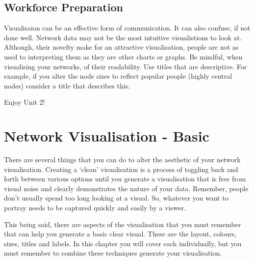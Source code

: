 \documentclass[
  letterpaper,
  DIV=11,
  numbers=noendperiod]{scrreprt}
\begin{document}
\section{Workforce Preparation}\label{workforce-preparation-1}

Visualisaion can be an effective form of communication. It can also
confuse, if not done well. Network data may not be the most intuitive
visualistions to look at. Although, their novelty make for an attractive
visualisation, people are not as used to interpreting them as they are
other charts or graphs. Be mindful, when visualising your networks, of
their readability. Use titles that are descriptive. For example, if you
alter the node sizes to reflect popular people (highly central nodes)
consider a title that describes this.

Enjoy Unit 2!

\chapter{Network Visualisation -
Basic}\label{network-visualisation---basic}

There are several things that you can do to alter the aesthetic of your
network visualisation. Creating a `clean' visualisation is a process of
toggling back and forth between various options until you generate a
visualisation that is free from visual noise and clearly demonstrates
the nature of your data. Remember, people don't usually spend too long
looking at a visual. So, whatever you want to portray needs to be
captured quickly and easily by a viewer.

This being said, there are aspects of the visualisation that you must
remember that can help you generate a basic clear visual. These are the
layout, colours, sizes, titles and labels. In this chapter you will
cover each individually, but you must remember to combine these
techniques generate your visualisation.
\end{document}

